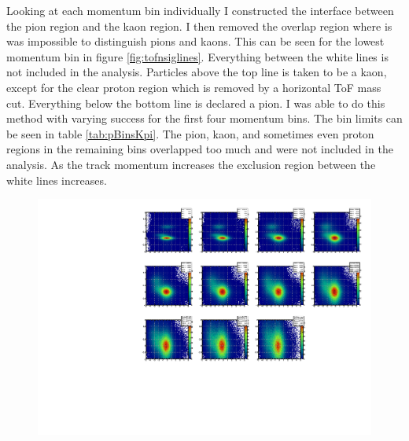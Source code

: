 \documentclass[abstract = on,listof=totoc, bibliography=totoc]{scrreprt}
\begin{document}
Looking at each momentum bin individually I constructed the interface between the pion region and the kaon region. I then removed the overlap region where is was impossible to distinguish pions and kaons. This can be seen for the lowest momentum bin in figure \ref{fig:tofnsiglines}. Everything between the white lines is not included in the analysis. Particles above the top line is taken to be a kaon, except for the clear proton region which is removed by a horizontal ToF mass cut. Everything below the bottom line is declared a pion. I was able to do this method with varying success for the first four momentum bins. The bin limits can be seen in table \ref{tab:pBinsKpi}. The pion, kaon, and sometimes even proton regions in the remaining bins overlapped too much and were not included in the analysis. As the track momentum increases the exclusion region between the white lines increases.    
\begin{figure}
\begin{center}
\includegraphics[width = 1\textwidth]{TofNSigmaPiPbins_new}
\caption[]{}
\label{fig:tofNSigma}
\end{center}
\end{figure}
\end{document}
